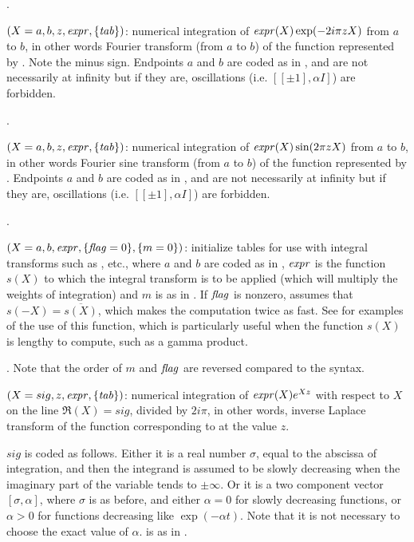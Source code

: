 .

$(X=a,b,z,\hbox{\it expr\/},\{\hbox{\it tab\/}\})$: numerical
integration of $\hbox{\it expr\/}(X)\exp(-2i\pi zX)$ from $a$ to $b$, in other words
Fourier transform (from $a$ to $b$) of the function represented by
. Note the minus sign. Endpoints $a$ and $b$ are coded as in
, and are not necessarily at infinity but if they are,
oscillations (i.e. $[[\pm1],\alpha I]$) are forbidden.

.

$(X=a,b,z,\hbox{\it expr\/},\{\hbox{\it tab\/}\})$: numerical
integration of $\hbox{\it expr\/}(X)\sin(2\pi zX)$ from $a$ to $b$, in other words
Fourier sine transform (from $a$ to $b$) of the function represented by
. Endpoints $a$ and $b$ are coded as in , and are not
necessarily at infinity but if they are, oscillations (i.e. $[[\pm1],\alpha
I]$) are forbidden.

.

$(X=a,b,\hbox{\it expr\/},\{\hbox{\it f\kern0pt lag\/}=0\},\{m=0\})$:
initialize tables for use with integral transforms such as ,
etc., where $a$ and $b$ are coded as in , $\hbox{\it expr\/}$ is the
function $s(X)$ to which the integral transform is to be applied (which will
multiply the weights of integration) and $m$ is as in . If
$\hbox{\it f\kern0pt lag\/}$ is nonzero, assumes that $s(-X)=\overline{s(X)}$, which makes the
computation twice as fast. See  for examples of the
use of this function, which is particularly useful when the function $s(X)$
is lengthy to compute, such as a gamma product.

.
Note that the order of $m$ and $\hbox{\it f\kern0pt lag\/}$ are reversed compared to the 
syntax.

$(X=sig,z,\hbox{\it expr\/},\{\hbox{\it tab\/}\})$:
numerical integration of $\hbox{\it expr\/}(X)e^{Xz}$ with respect to $X$ on the line
$\Re(X)=sig$, divided by $2i\pi$, in other words, inverse Laplace transform
of the function corresponding to  at the value $z$.

$sig$ is coded as follows. Either it is a real number $\sigma$, equal to the
abscissa of integration, and then the integrand is assumed to
be slowly decreasing when the imaginary part of the variable tends to
$\pm\infty$. Or it is a two component vector $[\sigma,\alpha]$, where
$\sigma$ is as before, and either $\alpha=0$ for slowly decreasing functions,
or $\alpha>0$ for functions decreasing like $\exp(-\alpha t)$. Note that it
is not necessary to choose the exact value of $\alpha$.  is as in
.

